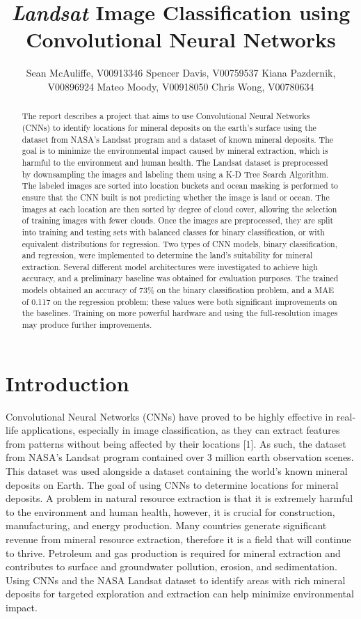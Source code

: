 \documentclass[10pt]{article}
\title{\emph{Landsat} Image Classification using Convolutional Neural Networks}
\author{
  Sean McAuliffe,  V00913346
  \And
  Spencer Davis, V00759537 
  \And
  Kiana Pazdernik, V00896924 
  \And
  Mateo Moody, V00918050 
  \And
  Chris Wong, V00780634 
}
\begin{document}
\maketitle

\begin{abstract}
  The report describes a project that aims to use Convolutional Neural Networks
  (CNNs) to identify locations for mineral deposits on the earth's surface using
  the dataset from NASA's Landsat program and a dataset of known mineral
  deposits. The goal is to minimize the environmental impact caused by mineral
  extraction, which is harmful to the environment and human health. The Landsat
  dataset is preprocessed by downsampling the images and labeling them using a
  K-D Tree Search Algorithm. The labeled images are sorted into location buckets
  and ocean masking is performed to ensure that the CNN built is not predicting
  whether the image is land or ocean. The images at each location are then
  sorted by degree of cloud cover, allowing the selection of training images
  with fewer clouds. Once the images are preprocessed, they are split into
  training and testing sets with balanced classes for binary classification,
  or with equivalent distributions for regression. Two types of CNN models,
  binary classification, and regression, were implemented to determine the
  land's suitability for mineral extraction. Several different model
  architectures were investigated to achieve high accuracy, and a preliminary
  baseline was obtained for evaluation purposes. The trained models obtained an
  accuracy of 73\% on the binary classification problem, and a MAE of 0.117 on
  the regression problem; these values were both significant improvements on the
  baselines. Training on more powerful hardware and using the full-resolution
  images may produce further improvements.
\end{abstract}

\section{Introduction}

Convolutional Neural Networks (CNNs) have proved to be highly
effective in real-life applications, especially in image classification, as they
can extract features from patterns without being affected by their locations [1].
As such, the dataset from NASA's Landsat program contained over 3 million earth
observation scenes. This dataset was used alongside a dataset containing the
world's known mineral deposits on Earth. The goal of using CNNs to determine
locations for mineral deposits. A problem in natural resource extraction is that
it is extremely harmful to the environment and human health, however, it is
crucial for construction, manufacturing, and energy production. Many countries
generate significant revenue from mineral resource extraction, therefore it is a
field that will continue to thrive. Petroleum and gas production is required for
mineral extraction and contributes to surface and groundwater pollution,
erosion, and sedimentation. Using CNNs and the NASA Landsat dataset to identify
areas with rich mineral deposits for targeted exploration and extraction can
help minimize environmental impact.
\end{document}
